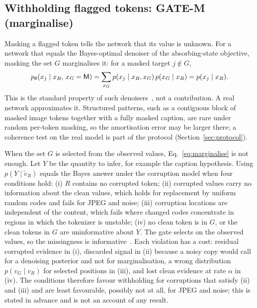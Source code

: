 \subsection{Withholding flagged tokens: GATE-M (marginalise)}\label{ssec:marginalise}
Masking a flagged token tells the network that its value is unknown.
For a network that equals the Bayes-optimal denoiser of the absorbing-state objective, masking the set $G$ marginalises it:
for a masked target $j\notin G$,
\begin{equation}
p_\theta(x_j\mid x_R,\,x_G=\mathsf{M})=\sum_{x_G}p(x_j\mid x_R,x_G)\,p(x_G\mid x_R)=p(x_j\mid x_R).
\label{eq:marginalise}
\end{equation}
This is the standard property of such denoisers~\citep{ou2025radd}, not a contribution.
A real network approximates it.
Structured patterns, such as a contiguous block of masked image tokens together with a fully masked caption, are rare under
random per-token masking, so the amortisation error may be larger there; a coherence test on the real model is part of the
protocol (Section~\ref{sec:protocol}).

When the set $G$ is selected from the observed values, Eq.~\eqref{eq:marginalise} is not enough.
Let $Y$ be the quantity to infer, for example the caption hypothesis.
Using $p(Y\mid\tilde v_R)$ equals the Bayes answer under the corruption model when four conditions hold:
(i) $R$ contains no corrupted token;
(ii) corrupted values carry no information about the clean values, which holds for replacement by uniform random codes
and fails for JPEG and noise;
(iii) corruption locations are independent of the content, which fails where changed codes concentrate in regions in which the
tokenizer is unstable;
(iv) no clean token is in $G$, or the clean tokens in $G$ are uninformative about $Y$.
The gate selects on the observed values, so the missingness is informative~\citep{rubin1976inference}.
Each violation has a cost: residual corrupted evidence in (i), discarded signal in (ii) because a noisy copy would call for a
denoising posterior and not for marginalisation, a wrong distribution $p(v_G\mid v_R)$ for selected positions in (iii), and lost
clean evidence at rate $\alpha$ in (iv).
The conditions therefore favour withholding for corruptions that satisfy (ii) and (iii) and are least favourable, possibly
not at all, for JPEG and noise; this is stated in advance and is not an account of any result.


